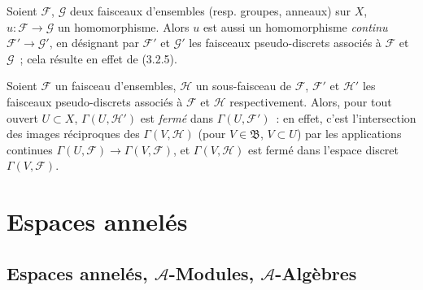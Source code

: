 \begin{env}[3.8.2]
\label{0.3.8.2-fr}
Soient $\mathcal{F}$, $\mathcal{G}$ deux faisceaux d'ensembles (resp. groupes,
anneaux) sur $X$, $u:\mathcal{F}\to\mathcal{G}$ un homomorphisme. Alors $u$
est aussi un homomorphisme \emph{continu} $\mathcal{F}'\to\mathcal{G}'$, en
désignant par $\mathcal{F}'$ et $\mathcal{G}'$ les faisceaux pseudo-discrets
associés à $\mathcal{F}$ et $\mathcal{G}$~; cela résulte en effet de
(3.2.5).
\end{env}

\begin{env}[3.8.3]
\label{0.3.8.3-fr}
Soient $\mathcal{F}$ un faisceau d'ensembles, $\mathcal{H}$ un sous-faisceau de
$\mathcal{F}$, $\mathcal{F}'$ et $\mathcal{H}'$ les faisceaux pseudo-discrets
associés à $\mathcal{F}$ et $\mathcal{H}$ respectivement. Alors, pour tout
ouvert $U\subset X$, $\Gamma(U,\mathcal{H}')$ est \emph{fermé} dans
$\Gamma(U,\mathcal{F}')$~: en effet, c'est l'intersection des images
réciproques des $\Gamma(V,\mathcal{H})$ (pour $V\in\mathfrak{B}$,
$V\subset U$) par les applications continues
$\Gamma(U,\mathcal{F})\to\Gamma(V,\mathcal{F})$, et
$\Gamma(V,\mathcal{H})$ est fermé dans l'espace discret
$\Gamma(V,\mathcal{F})$.
\end{env}

\section{Espaces annelés}
\label{section:0.4-fr}

\subsection{Espaces annelés, $\mathcal{A}$-Modules, $\mathcal{A}$-Algèbres}
\label{subsection:0.4.1-fr}

